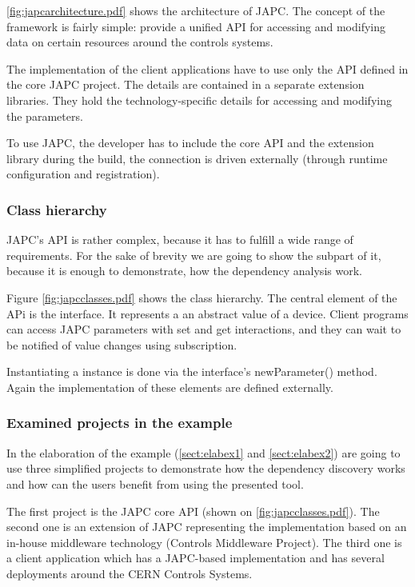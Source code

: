 \autoref{fig:japcarchitecture.pdf} shows the architecture of JAPC. The concept
of the framework is fairly simple: provide a unified API for accessing and
modifying data on certain resources around the controls systems. 

The implementation of the client applications have to use only the API defined
in the core JAPC project. The details are contained in a separate extension
libraries. They hold the  technology-specific details for accessing and
modifying the parameters. 

To use JAPC, the developer has to include the core API and the extension
library during the build, the connection is driven externally (through runtime
configuration and registration).


 \subsubsection{Class hierarchy}
JAPC's API is rather complex, because it has to fulfill a wide range of
requirements. For the sake of brevity we are going to show the subpart of it,
because it is enough to demonstrate, how the dependency analysis work.



Figure \autoref{fig:japcclasses.pdf} shows the class hierarchy.
The central element of the APi is the  interface.
It  represents a an abstract value of a device.
Client programs can access JAPC parameters with set and get interactions, and
they can wait to be notified of value changes using subscription.

Instantiating a  instance is done via the
 interface's newParameter() method. Again the
implementation of these elements are defined externally.

\subsubsection{Examined projects in the example}
In the elaboration of the example (\autoref{sect:elabex1} and
\autoref{sect:elabex2}) are going to use three simplified projects to
demonstrate how the dependency discovery works and how can the users benefit
from using the presented tool.

The first project is the JAPC core API (shown on \autoref{fig:japcclasses.pdf}).
The second one is an extension of JAPC representing the implementation based on 
an in-house middleware technology (Controls Middleware Project\cite{Cmw}). The
third one is a client application which has a JAPC-based implementation and has several
deployments around the CERN Controls Systems.


